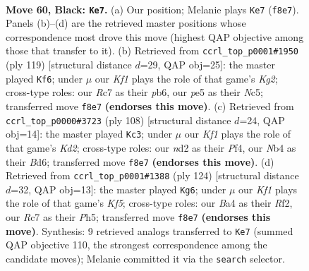 \documentclass[11pt]{article}
\begin{document}
\clearpage

\begin{figure}[p]\centering
\begin{subfigure}{0.46\textwidth}\centering
\resizebox{\linewidth}{!}{%
\newchessgame
\chessboard[
  setfen={5k2/2r2p1p/6p1/4P3/bn3Pp1/4K3/3N3P/1B6 b - - 11 60},
  showmover=false,
  pgfstyle=straightmove, color=movearrow, markmove={f8-e7}
]}
\caption{}
\end{subfigure}\hfill
\begin{subfigure}{0.46\textwidth}\centering
\resizebox{\linewidth}{!}{%
\newchessgame
\chessboard[
  setfen={8/5pk1/1P4p1/2np4/2p2P1p/4P2P/5KP1/1B6 b - - 2 60},
  showmover=false,
  pgfstyle=straightmove, color=movearrow, markmove={g7-f6}
]}
\caption{}
\end{subfigure}
\\[4pt]
\begin{subfigure}{0.46\textwidth}\centering
\resizebox{\linewidth}{!}{%
\newchessgame
\chessboard[
  setfen={8/1p3k2/3Bb1p1/p6p/P4P2/1P4P1/3KP3/8 w - - 1 55},
  showmover=false,
  pgfstyle=straightmove, color=movearrow, markmove={d2-c3}
]}
\caption{}
\end{subfigure}\hfill
\begin{subfigure}{0.46\textwidth}\centering
\resizebox{\linewidth}{!}{%
\newchessgame
\chessboard[
  setfen={8/4r3/B2k3b/p2p1K1P/2p2P2/P7/1P3R2/8 w - - 13 63},
  showmover=false,
  pgfstyle=straightmove, color=movearrow, markmove={f5-g6}
]}
\caption{}
\end{subfigure}
\caption{\textbf{Move 60, Black: \texttt{Ke7}.} (a) Our position; Melanie plays \texttt{Ke7} (\texttt{f8e7}). Panels (b)--(d) are the retrieved master positions whose correspondence most drove this move (highest QAP objective among those that transfer to it). (b) Retrieved from \texttt{ccrl\_top\_p0001\#1950} (ply 119) [structural distance $d$=29, QAP obj=25]: the master played \texttt{Kf6}; under $\mu$ our \emph{Kf1} plays the role of that game's \emph{Kg2}; cross-type roles: our \emph{R}c7 as their \emph{p}b6, our \emph{p}e5 as their \emph{N}c5; transferred move \texttt{f8e7} \textbf{(endorses this move)}. (c) Retrieved from \texttt{ccrl\_top\_p0000\#3723} (ply 108) [structural distance $d$=24, QAP obj=14]: the master played \texttt{Kc3}; under $\mu$ our \emph{Kf1} plays the role of that game's \emph{Kd2}; cross-type roles: our \emph{n}d2 as their \emph{P}f4, our \emph{N}b4 as their \emph{B}d6; transferred move \texttt{f8e7} \textbf{(endorses this move)}. (d) Retrieved from \texttt{ccrl\_top\_p0001\#1388} (ply 124) [structural distance $d$=32, QAP obj=13]: the master played \texttt{Kg6}; under $\mu$ our \emph{Kf1} plays the role of that game's \emph{Kf5}; cross-type roles: our \emph{B}a4 as their \emph{R}f2, our \emph{R}c7 as their \emph{P}h5; transferred move \texttt{f8e7} \textbf{(endorses this move)}. Synthesis: 9 retrieved analogs transferred to \texttt{Ke7} (summed QAP objective 110, the strongest correspondence among the candidate moves); Melanie committed it via the \texttt{search} selector.}
\label{fig:thought-m119}
\end{figure}
\end{document}
